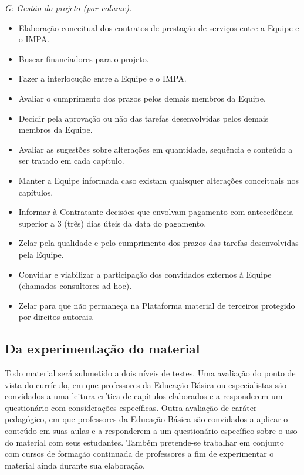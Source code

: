 \documentclass[10 pt]{article}
\begin{document}
{\it G: Gestão do projeto (por volume).}
\begin{itemize} %
  \item     Elaboração conceitual dos contratos de prestação de serviços entre a Equipe e o IMPA.
  \item     Buscar financiadores para o projeto.
  \item     Fazer a interlocução entre a Equipe e o IMPA. 
  \item     Avaliar o cumprimento dos prazos pelos demais membros da Equipe.
  \item     Decidir pela aprovação ou não das tarefas desenvolvidas pelos demais membros da Equipe.
  \item     Avaliar as sugestões sobre alterações em quantidade, sequência e conteúdo a ser tratado em cada capítulo.
  \item     Manter a Equipe informada caso existam quaisquer alterações conceituais nos capítulos.
  \item     Informar à Contratante decisões que envolvam pagamento com antecedência superior a 3 (três) dias úteis da data do pagamento.
  \item     Zelar pela qualidade e pelo cumprimento dos prazos das tarefas desenvolvidas pela Equipe.
  \item     Convidar e viabilizar a participação dos convidados externos à Equipe (chamados consultores ad hoc).
  \item     Zelar para que não permaneça na Plataforma material de terceiros protegido por direitos autorais.
\end{itemize} %

\subsection{Da experimentação do material}

Todo material será submetido a dois níveis de testes. 
Uma avaliação do ponto de vista do currículo, em que professores da Educação Básica ou especialistas são convidados a uma leitura crítica de capítulos elaborados e a responderem um questionário com considerações específicas. 
Outra avaliação de caráter pedagógico, em que professores da Educação Básica são convidados a aplicar o conteúdo em suas aulas e a responderem a um questionário específico sobre o uso do material com seus estudantes. Também pretende-se trabalhar em conjunto com cursos de formação continuada de professores a fim de experimentar o material ainda durante sua elaboração.
\end{document}
